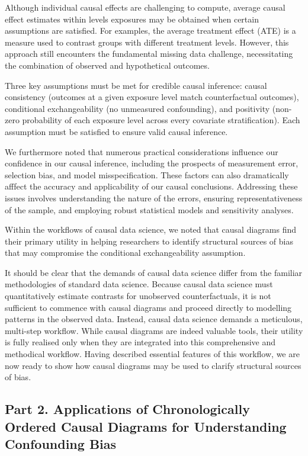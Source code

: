 \documentclass[
  singlecolumn,
  9pt]{article}
\begin{document}
Although individual causal effects are challenging to compute, average
causal effect estimates within levels exposures may be obtained when
certain assumptions are satisfied. For examples, the average treatment
effect (ATE) is a measure used to contrast groups with different
treatment levels. However, this approach still encounters the
fundamental missing data challenge, necessitating the combination of
observed and hypothetical outcomes.

Three key assumptions must be met for credible causal inference: causal
consistency (outcomes at a given exposure level match counterfactual
outcomes), conditional exchangeability (no unmeasured confounding), and
positivity (non-zero probability of each exposure level across every
covariate stratification). Each assumption must be satisfied to ensure
valid causal inference.

We furthermore noted that numerous practical considerations influence
our confidence in our causal inference, including the prospects of
measurement error, selection bias, and model misspecification. These
factors can also dramatically afffect the accuracy and applicability of
our causal conclusions. Addressing these issues involves understanding
the nature of the errors, ensuring representativeness of the sample, and
employing robust statistical models and sensitivity analyses.

Within the workflows of causal data science, we noted that causal
diagrams find their primary utility in helping researchers to identify
structural sources of bias that may compromise the conditional
exchangeability assumption.

It should be clear that the demands of causal data science differ from
the familiar methodologies of standard data science. Because causal data
science must quantitatively estimate contrasts for unobserved
counterfactuals, it is not sufficient to commence with causal diagrams
and proceed directly to modelling patterns in the observed data.
Instead, causal data science demands a meticulous, multi-step workflow.
While causal diagrams are indeed valuable tools, their utility is fully
realised only when they are integrated into this comprehensive and
methodical workflow. Having described essential features of this
workflow, we are now ready to show how causal diagrams may be used to
clarify structural sources of bias.

\subsection{Part 2. Applications of Chronologically Ordered Causal
Diagrams for Understanding Confounding
Bias}\label{part-2.-applications-of-chronologically-ordered-causal-diagrams-for-understanding-confounding-bias}
\end{document}
